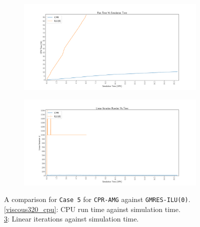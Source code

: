 \begin{figure}
\centering
\begin{subfigure}[b]{\textwidth}
   \includegraphics[width=1\linewidth]{figures/viscous/320x320/cpu_time.pdf}
   \caption{}
   \label{viscouse320_cpu}
\end{subfigure}

\begin{subfigure}[b]{\textwidth}
   \includegraphics[width=1\linewidth]{figures/viscous/320x320/its_time.pdf}
   \caption{}
   \label{viscous320_its}
\end{subfigure}

\caption[caption]{A comparison for \texttt{Case 5} for \texttt{CPR-AMG} against \texttt{GMRES-ILU(0)}.\\\hspace{\textwidth}
	\cref{viscous320_cpu}: CPU run time against simulation time. \\\hspace{\textwidth}
	\cref{viscous320_its}: Linear iterations against simulation time.\\\hspace{\textwidth}}
\end{figure}

